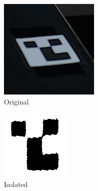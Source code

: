 \begin{figure}[!ht]
	\centering
	\begin{subfigure}{.24\textwidth}
		\centering
		\includegraphics[width=0.8\linewidth]{figures/fiducial-step1}
		\caption{Original}
		\label{fig:fiducial-step1}
	\end{subfigure}%
	\begin{subfigure}{.24\textwidth}
		\centering
		\includegraphics[width=0.8\linewidth]{figures/fiducial-step2}
		\caption{Isolated}
		\label{fig:fiducial-step2}
	\end{subfigure}
	\begin{subfigure}{.24\textwidth}

\end{subfigure}
\end{figure}
